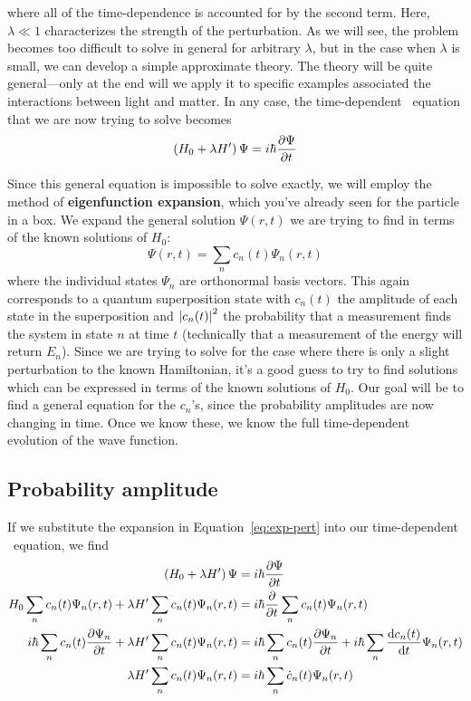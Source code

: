 where all of the time-dependence is accounted for by the second term. Here, $\lambda \ll 1$ characterizes the strength of the perturbation. As we will see, the problem becomes too difficult to solve in general for arbitrary $\lambda$, but in the case when $\lambda$ is small, we can develop a simple approximate theory. The theory will be quite general---only at the end will we apply it to specific examples associated the interactions between light and matter. In any case, the time-dependent \Sch\ equation that we are now trying to solve becomes
\begin{equation}
	\left(H_0 + \lambda H'\right)\Psi = i\hbar \pdv{\Psi}{t} \label{eq:sch-pert}
\end{equation}

Since this general equation is impossible to solve exactly, we will employ the method of \textbf{eigenfunction expansion}, which you've already seen for the particle in a box. We expand the general solution $\Psi(r,t)$ we are trying to find in terms of the known solutions of $H_0$:
\begin{equation}
	\Psi(r,t) = \sum_n c_n(t) \Psi_n(r,t) \label{eq:exp-pert}
\end{equation}
where the individual states $\Psi_n$ are orthonormal basis vectors. This again corresponds to a quantum superposition state with $c_n(t)$ the amplitude of each state in the superposition and $\abs{c_n(t)}^2$ the probability that a measurement finds the system in state $n$ at time $t$ (technically that a measurement of the energy will return $E_n$). Since we are trying to solve for the case where there is only a slight perturbation to the known Hamiltonian, it's a good guess to try to find solutions which can be expressed in terms of the known solutions of $H_0$. Our goal will be to find a general equation for the $c_n$'s, since the probability amplitudes are now changing in time. Once we know these, we know the full time-dependent evolution of the wave function. \par 


\subsection{Probability amplitude}
If we substitute the expansion in Equation~\ref{eq:exp-pert} into our time-dependent \Sch\ equation, we find
\begin{align*}
	\left(H_0 + \lambda H'\right)\Psi &= i\hbar \pdv{\Psi}{t} \\
	H_0 \sum_n c_n(t) \Psi_n(r,t) + \lambda H'\sum_n c_n(t) \Psi_n(r,t) &= i\hbar \pdv{t}\sum_n c_n(t) \Psi_n(r,t) \\
	i\hbar\sum_n c_n(t) \pdv{\Psi_n}{t} + \lambda H'\sum_n c_n(t) \Psi_n(r,t) &= i\hbar \sum_n c_n(t) \pdv{\Psi_n}{t} + i\hbar \sum_n \dv{c_n(t)}{t} \Psi_n(r,t) \\
	\lambda H'\sum_n c_n(t) \Psi_n(r,t) &= i\hbar \sum_n \dot{c}_n(t) \Psi_n(r,t)
\end{align*}

